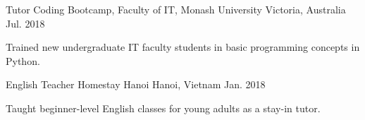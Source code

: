 \begin{cventries}
  \cventry
    {Tutor}
    {Coding Bootcamp, Faculty of IT, Monash University}
    {Victoria, Australia}
    {Jul. 2018}
    {
      \begin{cvitems}
        \item {Trained new undergraduate IT faculty students in basic programming concepts in Python.}
      \end{cvitems}
    }
  \cventry
    {English Teacher}
    {Homestay Hanoi}
    {Hanoi, Vietnam}
    {Jan. 2018}
    {
      \begin{cvitems}
        \item {Taught beginner-level English classes for young adults as a stay-in tutor.}
      \end{cvitems}
    }
\end{cventries}
